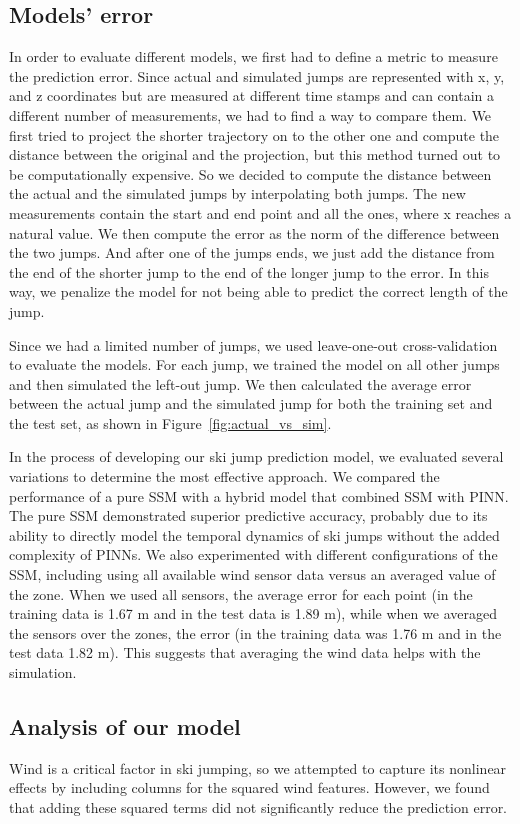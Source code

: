 \documentclass[sigconf]{acmart}
\begin{document}
\subsection{Models’ error}
In order to evaluate different models, we first had to define a metric to
measure the prediction error. Since actual and simulated jumps are represented
with x, y, and z coordinates but are measured at different time stamps and can
contain a different number of measurements, we had to find a way to compare
them. We first tried to project the shorter trajectory on to the other one and
compute the distance between the original and the projection, but this method
turned out to be computationally expensive. So we decided to compute the
distance between the actual and the simulated jumps by interpolating both
jumps. The new measurements contain the start and end point and all the ones,
where x reaches a natural value. We then compute the error as the norm of the
difference between the two jumps. And after one of the jumps ends, we just add
the distance from the end of the shorter jump to the end of the longer jump to
the error. In this way, we penalize the model for not being able to predict the
correct length of the jump.

Since we had a limited number of jumps, we used leave-one-out cross-validation
to evaluate the models. For each jump, we trained the model on all other jumps
and then simulated the left-out jump. We then calculated the average error
between the actual jump and the simulated jump for both the training set and
the test set, as shown in Figure~\ref{fig:actual_vs_sim}.

In the process of developing our ski jump prediction model, we evaluated several
variations to determine the most effective approach. We compared the
performance of a pure SSM with a hybrid model that combined SSM with PINN. The
pure SSM demonstrated superior predictive accuracy, probably due to its ability
to directly model the temporal dynamics of ski jumps without the added
complexity of PINNs. We also experimented with different configurations of the
SSM, including using all available wind sensor data versus an averaged value of
the zone. When we used all sensors, the average error for each point (in the
training data is 1.67 m and in the test data is 1.89 m), while when we averaged
the sensors over the zones, the error (in the training data was 1.76 m and in
the test data 1.82 m). This suggests that averaging the wind data helps with
the simulation.

\subsection{Analysis of our model}
Wind is a critical factor in ski jumping, so we attempted to capture its
nonlinear effects by including columns for the squared wind features. However,
we found that adding these squared terms did not significantly reduce the
prediction error.
\end{document}
